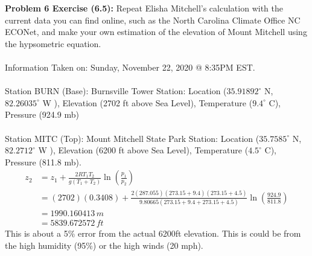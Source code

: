 \documentclass[11pt]{article}
\newenvironment{problem}[1]{\textbf{Problem #1:}}{\newpage}
\begin{document}
	\begin{problem}{6 Exercise (6.5)}
		Repeat Elisha Mitchell’s calculation with the current data you can find online, such
		as the North Carolina Climate Office NC ECONet, and make your own estimation of the
		elevation of Mount Mitchell using the hypsometric equation.
		\\ \\
		Information Taken on: Sunday, November 22, 2020 @ 8:35PM EST.
		\\ \\
		Station BURN (Base): Burnsville Tower Station: Location ($35.91892^\circ$ N, $82.26035^\circ$ W ), Elevation (2702 ft above Sea Level), Temperature ($9.4^\circ$ C), Pressure (924.9 mb) 
		\\ \\
		Station MITC (Top): Mount Mitchell State Park Station: Location ($35.7585^\circ$ N, $82.2712^\circ$ W ), Elevation (6200 ft above Sea Level), Temperature ($4.5^\circ$ C), Pressure (811.8 mb).
		\begin{align*}
			z_2 &= z_1 + \frac{2RT_1T_2}{g(T_1 + T_2)}\ln\left(\frac{p_1}{p_2}\right) \\
			&= (2702)(0.3408) + \frac{2(287.055)(273.15 + 9.4)(273.15 + 4.5)}{9.80665(273.15 + 9.4 + 273.15 + 4.5)}\ln\left(\frac{924.9}{811.8}\right) \\
			&= 1990.160413\,m \\
			&= 5839.672572\,ft
		\end{align*}
		This is about a 5\% error from the actual 6200ft elevation.  This is could be from the high humidity (95\%) or the high winds (20 mph).
	\end{problem}
\end{document}
